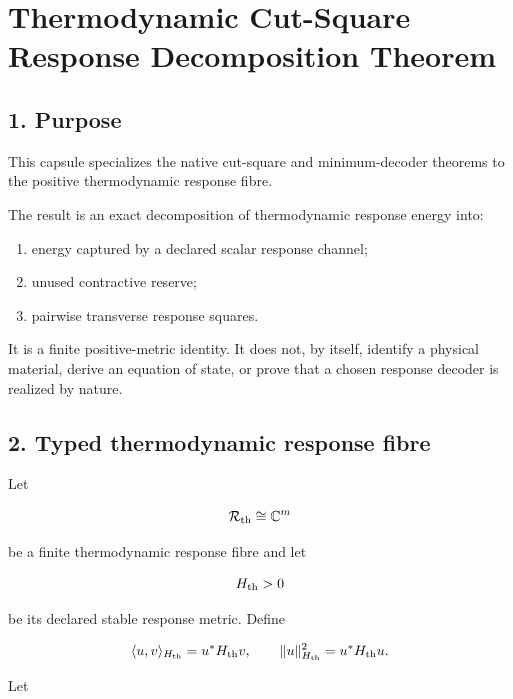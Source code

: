\hypertarget{thermodynamic-cut-square-response-decomposition-theorem}{%
\chapter{Thermodynamic Cut-Square Response Decomposition Theorem}\label{thermodynamic-cut-square-response-decomposition-theorem}}

\hypertarget{purpose}{%
\section{1. Purpose}\label{purpose}}

This capsule specializes the native cut-square and minimum-decoder theorems to the positive thermodynamic response fibre.

The result is an exact decomposition of thermodynamic response energy into:

\begin{enumerate}
\def\labelenumi{\arabic{enumi}.}
\tightlist
\item
  energy captured by a declared scalar response channel;
\item
  unused contractive reserve;
\item
  pairwise transverse response squares.
\end{enumerate}

It is a finite positive-metric identity. It does not, by itself, identify a physical material, derive an equation of state, or prove that a chosen response decoder is realized by nature.

\hypertarget{typed-thermodynamic-response-fibre}{%
\section{2. Typed thermodynamic response fibre}\label{typed-thermodynamic-response-fibre}}

Let

\[
\mathcal R_{\rm th}\cong\mathbb C^m
\]

be a finite thermodynamic response fibre and let

\[
H_{\rm th}>0
\]

be its declared stable response metric. Define

\[
\langle u,v\rangle_{H_{\rm th}}=u^*H_{\rm th}v,
\qquad
\|u\|_{H_{\rm th}}^2=u^*H_{\rm th}u.
\]

Let

